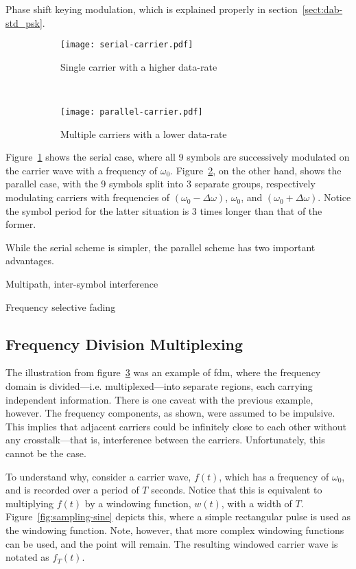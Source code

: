 \documentclass[class=report,11pt,crop=false]{standalone}
\begin{document}
Phase shift keying modulation, which is explained properly in section~\ref{sect:dab-std_psk}.

\begin{figure}[htbp]
    \centering
    \begin{subfigure}[t]{0.48\textwidth}
        \centering
        \texttt{[image: serial-carrier.pdf]}
        \caption{Single carrier with a higher data-rate}
        \label{fig:serial-carrier}
    \end{subfigure}%
    ~ 
    \begin{subfigure}[t]{0.48\textwidth}
        \centering
        \texttt{[image: parallel-carrier.pdf]}
        \caption{Multiple carriers with a lower data-rate}
        \label{fig:parallel-carrier}
    \end{subfigure}
    \caption{}
    \label{fig:carrier-illustration}
\end{figure}

Figure~\ref{fig:serial-carrier} shows the serial case, where all 9 symbols are successively modulated on the carrier wave with a frequency of \(\omega_0\). Figure~\ref{fig:parallel-carrier}, on the other hand, shows the parallel case, with the 9 symbols split into 3 separate groups, respectively modulating carriers with frequencies of \((\omega_0 - \Delta \omega)\), \(\omega_0\), and \((\omega_0 + \Delta \omega)\). Notice the symbol period for the latter situation is 3 times longer than that of the former.

While the serial scheme is simpler, the parallel scheme has two important advantages.

Multipath, inter-symbol interference

Frequency selective fading

\subsection{Frequency Division Multiplexing}
The illustration from figure~\ref{fig:carrier-illustration} was an example of \gls{fdm}, where the frequency domain is divided---i.e. multiplexed---into separate regions, each carrying independent information. There is one caveat with the previous example, however. The frequency components, as shown, were assumed to be impulsive. This implies that adjacent carriers could be infinitely close to each other without any crosstalk---that is, interference between the carriers. Unfortunately, this cannot be the case.

To understand why, consider a carrier wave, \(f(t)\), which has a frequency of \(\omega_0\), and is recorded over a period of \(T\) seconds. Notice that this is equivalent to multiplying \(f(t)\) by a windowing function, \(w(t)\), with a width of \(T\). Figure~\ref{fig:sampling-sine} depicts this, where a simple rectangular pulse is used as the windowing function. Note, however, that more complex windowing functions can be used, and the point will remain. The resulting windowed carrier wave is notated as \(f_T(t)\).
\end{document}
